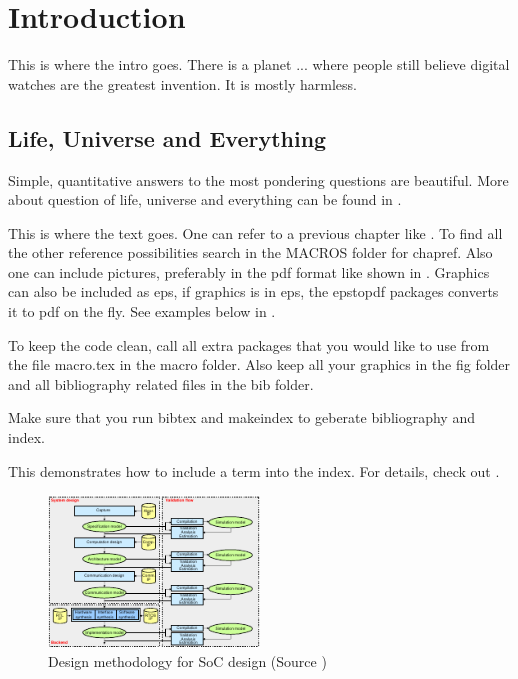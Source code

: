 
\chapter{Introduction}
\label{chap:intro}
This is where the intro goes.
There is a planet ... where people still believe digital watches are the
greatest invention. It is mostly harmless.

\section{Life, Universe and Everything}
\label{chap:intro:design}

Simple, quantitative answers to the most pondering questions are beautiful. More about question of life, universe and everything can be found in \cite{book:42}.

This is where the text goes. One can refer to a previous chapter like . To find all the other reference possibilities search in the MACROS folder for chapref. Also one can include pictures, preferably in the pdf format like shown in . Graphics can also be included as eps, if graphics is in eps, the epstopdf packages converts it to pdf on the fly. See examples below in .

To keep the code clean, call all extra packages that you would like to use from the file macro.tex in the macro folder. Also keep all your graphics in the fig folder and all bibliography related files in the bib folder.

Make sure that you run bibtex and makeindex to geberate bibliography and index.

This demonstrates how to include a term into the index. For details, check out \cite{latex:index}.

\begin{figure}[htbp]
  \centering
    \includegraphics[width=0.5\textwidth]{fig/meth.pdf}
  \caption[Design methodology for SoC design]{\label{fig:intro:meth} Design methodology for SoC design (Source \cite{book:SpecC:yellow})}
\end{figure}

